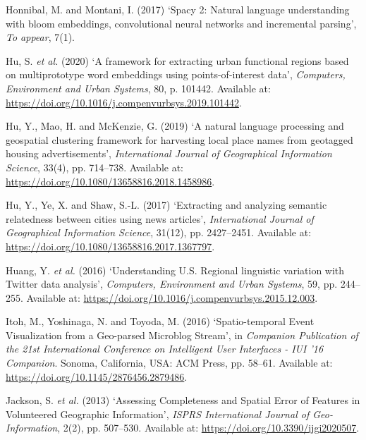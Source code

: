 \documentclass[
  letterpaper,
  11pt,
  english,
  onehalfspacing,
  headsepline]{MastersDoctoralThesis}
\newlength{\cslhangindent}
\newlength{\cslentryspacingunit} %
\newenvironment{CSLReferences}[2] %
 {%
  \setlength{\parindent}{0pt}
  \ifodd #1
  \let\oldpar\par
  \def\par{\hangindent=\cslhangindent\oldpar}
  \fi
  \setlength{\parskip}{#2\cslentryspacingunit}
 }%
 {}
\begin{document}
\begin{CSLReferences}{0}{0}
\leavevmode{}%
Honnibal, M. and Montani, I. (2017) {`Spacy 2: {Natural} language
understanding with bloom embeddings, convolutional neural networks and
incremental parsing'}, \emph{To appear}, 7(1).

\leavevmode{}%
Hu, S. \emph{et al.} (2020) {`A framework for extracting urban
functional regions based on multiprototype word embeddings using
points-of-interest data'}, \emph{Computers, Environment and Urban
Systems}, 80, p. 101442. Available at:
\url{https://doi.org/10.1016/j.compenvurbsys.2019.101442}.

\leavevmode{}%
Hu, Y., Mao, H. and McKenzie, G. (2019) {`A natural language processing
and geospatial clustering framework for harvesting local place names
from geotagged housing advertisements'}, \emph{International Journal of
Geographical Information Science}, 33(4), pp. 714--738. Available at:
\url{https://doi.org/10.1080/13658816.2018.1458986}.

\leavevmode{}%
Hu, Y., Ye, X. and Shaw, S.-L. (2017) {`Extracting and analyzing
semantic relatedness between cities using news articles'},
\emph{International Journal of Geographical Information Science},
31(12), pp. 2427--2451. Available at:
\url{https://doi.org/10.1080/13658816.2017.1367797}.

\leavevmode{}%
Huang, Y. \emph{et al.} (2016) {`Understanding {U}.{S}. Regional
linguistic variation with {Twitter} data analysis'}, \emph{Computers,
Environment and Urban Systems}, 59, pp. 244--255. Available at:
\url{https://doi.org/10.1016/j.compenvurbsys.2015.12.003}.

\leavevmode{}%
Itoh, M., Yoshinaga, N. and Toyoda, M. (2016) {`Spatio-temporal {Event
Visualization} from a {Geo-parsed Microblog Stream}'}, in
\emph{Companion {Publication} of the 21st {International Conference} on
{Intelligent User Interfaces} - {IUI} '16 {Companion}}. {Sonoma,
California, USA}: {ACM Press}, pp. 58--61. Available at:
\url{https://doi.org/10.1145/2876456.2879486}.

\leavevmode{}%
Jackson, S. \emph{et al.} (2013) {`Assessing {Completeness} and {Spatial
Error} of {Features} in {Volunteered Geographic Information}'},
\emph{ISPRS International Journal of Geo-Information}, 2(2), pp.
507--530. Available at: \url{https://doi.org/10.3390/ijgi2020507}.


\end{CSLReferences}
\end{document}
